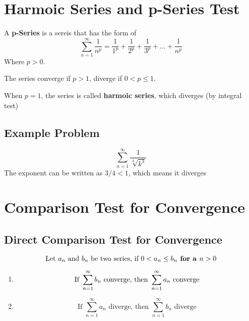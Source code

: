 \documentclass{article}
\numberwithin{equation}{section}
\begin{document}
\newpage
\section{Harmoic Series and p-Series Test}
A \textbf{p-Series} is a sereis that has the form of
\[
    \sum_{n = 1}^{\infty} \frac{1}{n^p} = \frac{1}{1^p} + \frac{1}{2^p} + \frac{1}{3^p} + ... + \frac{1}{n^p}
\]
Where $p > 0$.

The series converge if $p > 1$, diverge if $0 < p \leq 1$.

When $p = 1$, the series is called \textbf{harmoic series}, which diverges (by integral test)

\subsection{Example Problem}
    \[
    \sum_{n = 1}^{\infty} \frac{1}{\sqrt[4]{k^3}}
    \]
    The exponent can be written as $3/4 < 1$, which means it diverges 


\section{Comparison Test for Convergence}
\subsection{Direct Comparison Test for Convergence}
\[
    \text{Let } a_n \text{ and } b_n \text{ be two series, if } 0 < a_n \leq b_n \textbf{ for a } n > 0\\
\]
\begin{enumerate}
    \item
    \[
    \text{If } \sum_{n = 1}^{\infty} b_n \text{ converge, then } \sum_{n = 1}^{\infty} a_n \text{ converge}\\
    \]
    \item 
    \[
    \text{If } \sum_{n = 1}^{\infty} a_n \text{ diverge, then } \sum_{n = 1}^{\infty} b_n \text{ diverge}
    \]
\end{enumerate}
\end{document}
